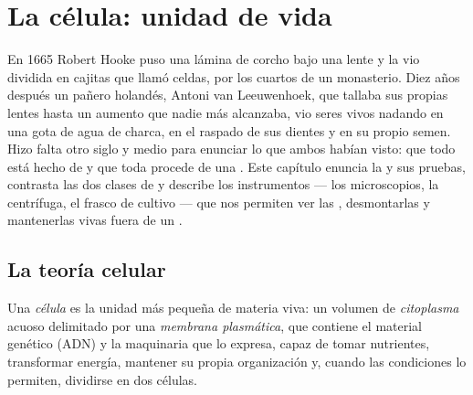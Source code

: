 \chapter{La célula: unidad de vida}\label{ch:b1:cell-unit-of-life}

En 1665 Robert Hooke puso una lámina de corcho bajo una lente y la vio
dividida en cajitas que llamó celdas, por los cuartos de un monasterio.
Diez años después un pañero holandés, Antoni van Leeuwenhoek, que tallaba
sus propias lentes hasta un aumento que nadie más alcanzaba, vio seres vivos
nadando en una gota de agua de charca, en el raspado de sus dientes y en su
propio semen. Hizo falta otro siglo y medio para enunciar lo que ambos
habían visto: que todo  está hecho de  y que toda 
procede de una . Este capítulo enuncia la  y sus
pruebas, contrasta las dos clases de  y describe los instrumentos ---
los microscopios, la centrífuga, el frasco de cultivo --- que nos permiten
ver las , desmontarlas y mantenerlas vivas fuera de un .

\section{La teoría celular}

\begin{definition}[Célula]\label{def:b1:cell-unit-of-life:cell}
Una \emph{célula} es la unidad más pequeña de materia viva: un
volumen de \emph{citoplasma} acuoso delimitado por una
\emph{membrana plasmática}, que contiene el
material genético (ADN) y la maquinaria que lo expresa, capaz de tomar
nutrientes, transformar energía, mantener su propia organización y, cuando
las condiciones lo permiten, dividirse en dos células.
\end{definition}

